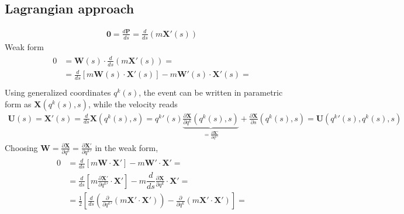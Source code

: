 \documentclass[letterpaper,10pt,english]{jupyterBook}
\begin{document}
\subsection{Lagrangian approach}
\label{\detokenize{ch/relativity-special/notes:lagrangian-approach}}
\sphinxAtStartPar
{}
\begin{equation*}
\begin{split}\mathbf{0} = \frac{d \mathbf{P}}{d s} = \frac{d }{d s} \left( m \mathbf{X}'(s) \right)\end{split}
\end{equation*}
\sphinxAtStartPar
Weak form
\begin{equation*}
\begin{split}\begin{aligned}
  0
  & = \mathbf{W}(s) \cdot \frac{d }{d s} \left( m \mathbf{X}'(s) \right) = \\
  & = \frac{d }{d s} \left[ m \mathbf{W}(s) \cdot \mathbf{X}'(s) \right] - m \mathbf{W}'(s) \cdot \mathbf{X}'(s)  = \\
\end{aligned}\end{split}
\end{equation*}
\sphinxAtStartPar
Using generalized coordinates \(q^k(s)\), the event can be written in parametric form as \(\mathbf{X}(q^k(s), s)\), while the velocity reads
\begin{equation*}
\begin{split}\mathbf{U}(s) = \mathbf{X}'(s) = \frac{d}{ds} \mathbf{X}(q^k(s), s) = {q^k}'(s) \underbrace{\frac{\partial \mathbf{X}}{\partial q^k}(q^k(s), s)}_{=\frac{\partial \mathbf{X}'}{\partial {q^k}'}} + \frac{\partial \mathbf{X}}{\partial s}(q^k(s), s) = \mathbf{U}({q^k}'(s), q^k(s), s)\end{split}
\end{equation*}
\sphinxAtStartPar
Choosing \(\mathbf{W} = \frac{\partial \mathbf{X}}{\partial q^k} = \frac{\partial \mathbf{X}'}{\partial {q^k}'}\) in the weak form,
\begin{equation*}
\begin{split}\begin{aligned}
0  
& = \frac{d }{d s} \left[ m \mathbf{W} \cdot \mathbf{X}' \right] - m \mathbf{W}' \cdot \mathbf{X}' = \\
& = \frac{d }{d s} \left[ m \frac{\partial \mathbf{X}'}{\partial {q^k}'} \cdot \mathbf{X}' \right] - m \dfrac{d}{ds} \frac{\partial \mathbf{X}}{\partial {q^k}} \cdot \mathbf{X}' = \\
& = \frac{1}{2} \left[ \frac{d}{d s} \left( \frac{\partial}{\partial {q^k}'}\left( m \mathbf{X}' \cdot \mathbf{X}' \right)  \right) - \frac{\partial}{\partial q^k}\left( m \mathbf{X}' \cdot \mathbf{X}' \right)  \right] =
\end{aligned}\end{split}
\end{equation*}
\end{document}
